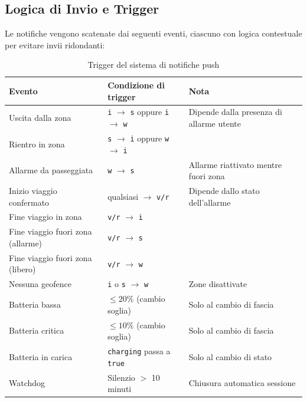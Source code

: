 \documentclass[12pt,a4paper]{article}
\begin{document}
\subsection{Logica di Invio e Trigger}
Le notifiche vengono scatenate dai seguenti eventi, ciascuno con logica contestuale per evitare invii ridondanti:

\begin{table}[H]
\centering
\begin{tabular}{@{}lp{4.5cm}p{5cm}@{}}
\toprule
\textbf{Evento} & \textbf{Condizione di trigger} & \textbf{Nota} \\
\midrule
Uscita dalla zona      & \texttt{i} $\to$ \texttt{s} oppure \texttt{i} $\to$ \texttt{w} & Dipende dalla presenza di allarme utente \\
Rientro in zona        & \texttt{s} $\to$ \texttt{i} oppure \texttt{w} $\to$ \texttt{i} & \\
Allarme da passeggiata & \texttt{w} $\to$ \texttt{s}                                    & Allarme riattivato mentre fuori zona \\
Inizio viaggio confermato & qualsiasi $\to$ \texttt{v/r}                     & Dipende dallo stato dell'allarme\\
Fine viaggio in zona   & \texttt{v/r} $\to$ \texttt{i}                                    & \\
Fine viaggio fuori zona (allarme) & \texttt{v/r} $\to$ \texttt{s}                        & \\
Fine viaggio fuori zona (libero)  & \texttt{v/r} $\to$ \texttt{w}                        & \\
Nessuna geofence       & \texttt{i} o \texttt{s} $\to$ \texttt{w}               & Zone disattivate \\
Batteria bassa         & $\leq 20\%$ (cambio soglia)                                    & Solo al cambio di fascia \\
Batteria critica       & $\leq 10\%$ (cambio soglia)                                    & Solo al cambio di fascia \\
Batteria in carica     & \texttt{charging} passa a \texttt{true}                        & Solo al cambio di stato \\
Watchdog               & Silenzio $>$ 10 minuti                                         & Chiusura automatica sessione \\
\bottomrule
\end{tabular}
\caption{Trigger del sistema di notifiche push}
\label{tab:notifiche}
\end{table}
\end{document}
